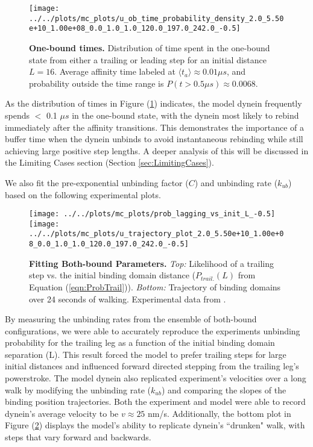 \begin{figure}[H]
	\centering
	\texttt{[image: ../../plots/mc\_plots/u\_ob\_time\_probability\_density\_2.0\_5.50e+10\_1.00e+08\_0.0\_1.0\_1.0\_120.0\_197.0\_242.0\_-0.5]}
	\caption[One-bound times]{\textbf{One-bound times.} Distribution of time spent in the one-bound state from either a trailing or leading step for an initial distance $L=16$. Average affinity time labeled at $\langle t_a \rangle \approx 0.01 \mu s$, and probability outside the time range is $P(t>0.5\mu s) \approx 0.0068$.}
	\label{fig:OBtime}
\end{figure}
\newpage
As the distribution of times in Figure (\ref{fig:OBtime}) indicates, the model dynein frequently spends $<$ 0.1 $\mu s$ in the one-bound state, with the dynein most likely to rebind immediately after the affinity transitions. This demonstrates the importance of a buffer time when the dynein unbinds to avoid instantaneous rebinding while still achieving large positive step lengths. A deeper analysis of this will be discussed in the Limiting Cases section (Section \ref{sec:LimitingCases}).

We also fit the pre-exponential unbinding factor ($C$) and unbinding rate ($k_{ub}$) based on the following experimental plots.

\begin{figure}[H]
	\centering
	\texttt{[image: ../../plots/mc\_plots/prob\_lagging\_vs\_init\_L\_-0.5]}
	\texttt{[image: ../../plots/mc\_plots/u\_trajectory\_plot\_2.0\_5.50e+10\_1.00e+08\_0.0\_1.0\_1.0\_120.0\_197.0\_242.0\_-0.5]}
	\caption[Fitting Both-bound Parameters]{\textbf{Fitting Both-bound Parameters.} \textit{Top: }Likelihood of a trailing step vs. the initial binding domain distance ($P_{trail.}(L)$ from Equation (\ref{eqn:ProbTrail})). \textit{Bottom: }Trajectory of binding domains over 24 seconds of walking. Experimental data from \cite{Dewitt2012}.}
	\label{fig:BBPlots}
\end{figure}
\newpage

By measuring the unbinding rates from the ensemble of both-bound configurations, we were able to accurately reproduce the experiments unbinding probability for the trailing leg as a function of the initial binding domain separation (L). This result forced the model to prefer trailing steps for large initial distances and influenced forward directed stepping from the trailing leg's powerstroke. The model dynein also replicated experiment's velocities over a long walk by modifying the unbinding rate ($k_{ub}$) and comparing the slopes of the binding position trajectories. Both the experiment and model were able to record dynein's average velocity to be $v\approx25$ nm/s. Additionally, the bottom plot in Figure (\ref{fig:BBPlots}) displays the model's ability to replicate dynein's ``drunken" walk, with steps that vary forward and backwards. 

